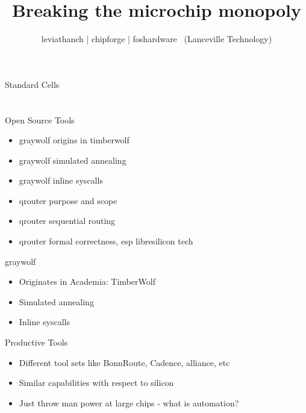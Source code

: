 \documentclass[9pt]{beamer}
\author{leviathanch | chipforge | foshardware \ (Lanceville Technology)}
\title{Breaking the microchip monopoly}
\begin{document}

\section[Standard Cells]{}
\begin{frame}{Standard Cells}
\end{frame}

\section[Place'n'Route]{}
\begin{frame}{Open Source Tools}
	\begin{itemize}
        \setlength\itemsep{1em}
		\item graywolf origins in timberwolf
		\item graywolf simulated annealing
		\item graywolf inline syscalls
		\item qrouter purpose and scope
		\item qrouter sequential routing
		\item qrouter formal correctness, esp libresilicon tech
	\end{itemize}
\end{frame}

\begin{frame}{graywolf}
	\begin{itemize}
        \setlength\itemsep{1em}
		\item Originates in Academia: TimberWolf
		\item Simulated annealing
		\item Inline syscalls
	\end{itemize}
\end{frame}

\begin{frame}{Productive Tools}
	\begin{itemize}
        \setlength\itemsep{1em}
		\item Different tool sets like BonnRoute, Cadence, alliance, etc
		\item Similar capabilities with respect to silicon
		\item Just throw man power at large chips - what is automation?
	\end{itemize}
\end{frame}
\end{document}

